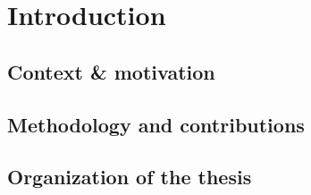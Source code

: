 \section{Introduction}

\subsection{Context \& motivation}


\subsection{Methodology and contributions}

\subsection{Organization of the thesis}




